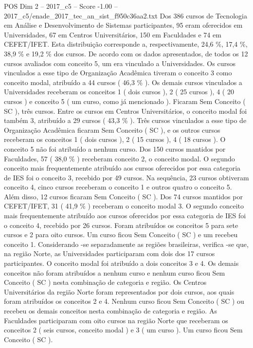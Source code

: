 \begin{textsample}{POS Dim 2 – 2017\_c5 – Score -1.00 – 2017\_c5/enade\_2017\_tec\_an\_sist\_f950c36aa2.txt}
Dos 386 cursos de Tecnologia em Análise e Desenvolvimento de Sistemas participantes, 95 eram oferecidos em Universidades, 67 em Centros Universitários, 150 em Faculdades e 74 em CEFET/IFET.
Esta distribuição corresponde a, respectivamente, 24,6 \%, 17,4 \%, 38,9 \% e 19,2 \% dos cursos.
De acordo com os dados apresentados, de todos os 12 cursos avaliados com conceito 5, um era vinculado a Universidades.
Os cursos vinculados a esse tipo de Organização Acadêmica tiveram o conceito 3 como conceito modal, atribuído a 44 cursos ( 46,3 \% ).
Os demais cursos vinculados a Universidades receberam os conceitos 1 ( dois cursos ), 2 ( 25 cursos ), 4 ( 20 cursos ) e conceito 5 ( um curso, como já mencionado ).
Ficaram Sem Conceito ( SC ), três cursos.
Entre os cursos em Centros Universitários, o conceito modal foi também 3, atribuído a 29 cursos ( 43,3 \% ).
Três cursos vinculados a esse tipo de Organização Acadêmica ficaram Sem Conceito ( SC ), e os outros cursos receberam os conceitos 1 ( dois cursos ), 2 ( 15 cursos ), 4 ( 18 cursos ).
O conceito 5 não foi atribuído a nenhum curso.
Dos 150 cursos mantidos por Faculdades, 57 ( 38,0 \% ) receberam conceito 2, o conceito modal.
O segundo conceito mais frequentemente atribuído aos cursos oferecidos por essa categoria de IES foi o conceito 3, recebido por 49 cursos.
Na sequência, 23 cursos obtiveram conceito 4, cinco cursos receberam o conceito 1 e outros quatro o conceito 5.
Além disso, 12 cursos ficaram Sem Conceito ( SC ).
Dos 74 cursos mantidos por CEFET/IFET, 31 ( 41,9 \% ) receberam o conceito modal 3.
O segundo conceito mais frequentemente atribuído aos cursos oferecidos por essa categoria de IES foi o conceito 4, recebido por 26 cursos.
Foram atribuídos os conceitos 5 para sete cursos e 2 para oito cursos.
Um curso ficou Sem Conceito ( SC ) e um recebeu conceito 1.
Considerando -se separadamente as regiões brasileiras, verifica -se que, na região Norte, as Universidades participaram com dois dos 17 cursos participantes.
O conceito modal foi atribuído a dois conceitos 3 e 4.
Os demais conceitos não foram atribuídos a nenhum curso e nenhum curso ficou Sem Conceito ( SC ) nesta combinação de categoria e região.
Os Centros Universitários da região Norte foram representados por dois cursos, aos quais foram atribuídos os conceitos 2 e 4.
Nenhum curso ficou Sem Conceito ( SC ) ou recebeu os demais conceitos nesta combinação de categoria e região.
As Faculdades participaram com oito cursos na região Norte que receberam os conceitos 2 ( seis cursos, conceito modal ) e 3 ( um curso ).
Um curso ficou Sem Conceito ( SC ).

\end{textsample}
